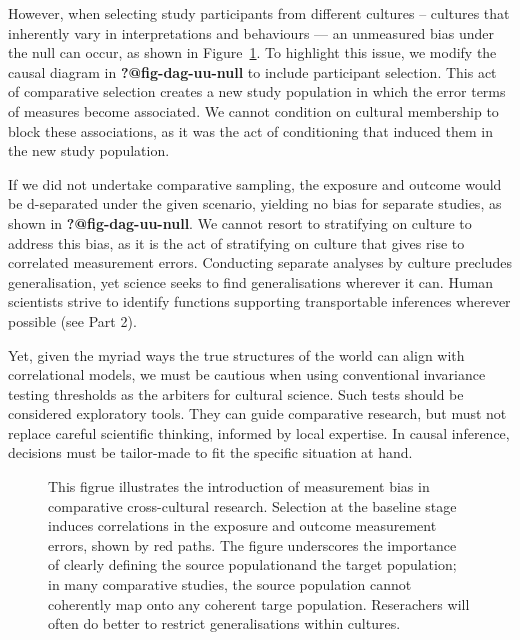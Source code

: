 \documentclass[
  singlecolumn,
  9pt]{article}
\begin{document}
However, when selecting study participants from different cultures --
cultures that inherently vary in interpretations and behaviours --- an
unmeasured bias under the null can occur, as shown in
Figure~\ref{fig-dag-dep-u-effect-selection}. To highlight this issue, we
modify the causal diagram in \textbf{?@fig-dag-uu-null} to include
participant selection. This act of comparative selection creates a new
study population in which the error terms of measures become associated.
We cannot condition on cultural membership to block these associations,
as it was the act of conditioning that induced them in the new study
population.

If we did not undertake comparative sampling, the exposure and outcome
would be d-separated under the given scenario, yielding no bias for
separate studies, as shown in \textbf{?@fig-dag-uu-null}. We cannot
resort to stratifying on culture to address this bias, as it is the act
of stratifying on culture that gives rise to correlated measurement
errors. Conducting separate analyses by culture precludes
generalisation, yet science seeks to find generalisations wherever it
can. Human scientists strive to identify functions supporting
transportable inferences wherever possible (see Part 2).

Yet, given the myriad ways the true structures of the world can align
with correlational models, we must be cautious when using conventional
invariance testing thresholds as the arbiters for cultural science. Such
tests should be considered exploratory tools. They can guide comparative
research, but must not replace careful scientific thinking, informed by
local expertise. In causal inference, decisions must be tailor-made to
fit the specific situation at hand.

\begin{figure}


\caption{\label{fig-dag-dep-u-effect-selection}This figrue illustrates
the introduction of measurement bias in comparative cross-cultural
research. Selection at the baseline stage induces correlations in the
exposure and outcome measurement errors, shown by red paths. The figure
underscores the importance of clearly defining the source populationand
the target population; in many comparative studies, the source
population cannot coherently map onto any coherent targe population.
Reserachers will often do better to restrict generalisations within
cultures.}

\end{figure}%
\end{document}
